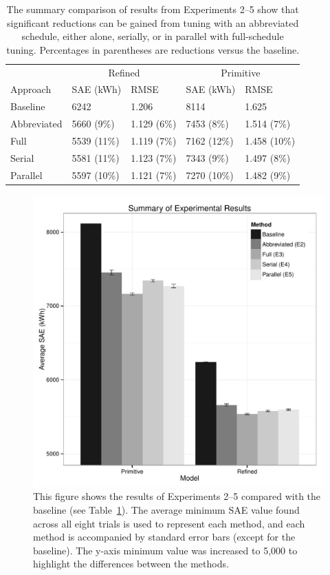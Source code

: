 \documentclass[preprint, review, 12pt]{elsarticle}
\begin{document}
{\begin{table}[htbp]
\centering
\caption{The summary comparison of results from Experiments 2--5 show that significant reductions can be gained from tuning with an abbreviated schedule, either alone, serially, or in parallel with full-schedule tuning. Percentages in parentheses are reductions versus the baseline.}
\label{tab:hourly-summary}
\begin{tabular}{lllll}
\toprule
 &  \multicolumn{2}{c}{Refined} & \multicolumn{2}{c}{Primitive}\\
Approach & SAE (kWh) & RMSE & SAE (kWh) & RMSE \\
\midrule
Baseline    & 6242        & 1.206       & 8114        & 1.625 \\\rowcolor{DarkRow}
Abbreviated & 5660 (9\%)  & 1.129 (6\%) & 7453 (8\%)  & 1.514 (7\%)\\
Full        & 5539 (11\%) & 1.119 (7\%) & 7162 (12\%) & 1.458 (10\%)\\\rowcolor{DarkRow}
Serial      & 5581 (11\%) & 1.123 (7\%) & 7343 (9\%)  & 1.497 (8\%)\\
Parallel    & 5597 (10\%) & 1.121 (7\%) & 7270 (10\%) & 1.482 (9\%)\\
\bottomrule
\end{tabular}
\end{table}

\begin{figure}[htbp]
\centering
\includegraphics[width=5in]{figure3}
\caption{This figure shows the results of Experiments 2--5 compared with the baseline (see Table~\ref{tab:hourly-summary}). The average minimum SAE value found across all eight trials is used to represent each method, and each method is accompanied by standard error bars (except for the baseline). The y-axis minimum value was increased to 5,000 to highlight the differences between the methods.}
\label{fig:hourly-summary}
\end{figure}

}
\end{document}
